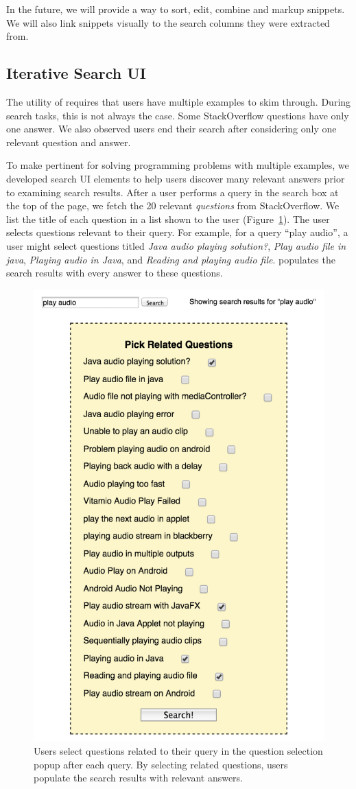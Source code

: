 In the future, we will provide a way to sort, edit, combine and markup snippets.
We will also link snippets visually to the search columns they were extracted from.

\subsection{Iterative Search UI}

The utility of \systemname{} requires that users have multiple examples to skim through.
During search tasks, this is not always the case.
Some StackOverflow questions have only one answer.
We also observed users end their search after considering only one relevant question and answer.

To make \systemname{} pertinent for solving programming problems with multiple examples, we developed search UI elements to help users discover many relevant answers prior to examining search results.
After a user performs a query in the search box at the top of the page, we fetch the 20 relevant \emph{questions} from StackOverflow.
We list the title of each question in a list shown to the user (Figure~\ref{fig:question_selection}).
The user selects questions relevant to their query.
For example, for a query ``play audio'', a user might select questions titled \emph{Java audio playing solution?}, \emph{Play audio file in java}, \emph{Playing audio in Java}, and \emph{Reading and playing audio file}.
\systemname{} populates the search results with every answer to these questions.

\begin{figure}
    \centering
    \includegraphics[width=.6\columnwidth]{figures/question_selection.png}
    \caption{Users select questions related to their query in the question selection popup after each query.
    By selecting related questions, users populate the search results with relevant answers.}
    \label{fig:question_selection}
\end{figure}

